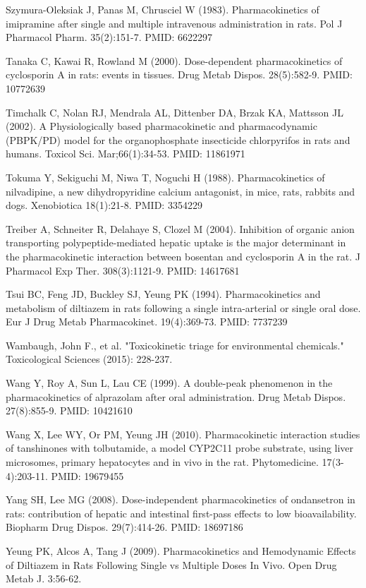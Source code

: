 \documentclass[a4paper]{book}
\begin{document}
\begin{References}
Szymura-Oleksiak J, Panas M, Chrusciel W (1983). Pharmacokinetics of
imipramine after single and multiple intravenous administration in rats. Pol
J Pharmacol Pharm. 35(2):151-7. PMID: 6622297

Tanaka C, Kawai R, Rowland M (2000). Dose-dependent pharmacokinetics of
cyclosporin A in rats: events in tissues. Drug Metab Dispos. 28(5):582-9.
PMID: 10772639

Timchalk C, Nolan RJ, Mendrala AL, Dittenber DA, Brzak KA, Mattsson JL
(2002). A Physiologically based pharmacokinetic and pharmacodynamic
(PBPK/PD) model for the organophosphate insecticide chlorpyrifos in rats and
humans. Toxicol Sci. Mar;66(1):34-53. PMID: 11861971

Tokuma Y, Sekiguchi M, Niwa T, Noguchi H (1988). Pharmacokinetics of
nilvadipine, a new dihydropyridine calcium antagonist, in mice, rats,
rabbits and dogs. Xenobiotica 18(1):21-8. PMID: 3354229

Treiber A, Schneiter R, Delahaye S, Clozel M (2004). Inhibition of organic
anion transporting polypeptide-mediated hepatic uptake is the major
determinant in the pharmacokinetic interaction between bosentan and
cyclosporin A in the rat. J Pharmacol Exp Ther. 308(3):1121-9. PMID:
14617681

Tsui BC, Feng JD, Buckley SJ, Yeung PK (1994). Pharmacokinetics and
metabolism of diltiazem in rats following a single intra-arterial or single
oral dose. Eur J Drug Metab Pharmacokinet. 19(4):369-73. PMID: 7737239

Wambaugh, John F., et al. "Toxicokinetic triage for environmental
chemicals." Toxicological Sciences (2015): 228-237.

Wang Y, Roy A, Sun L, Lau CE (1999). A double-peak phenomenon in the
pharmacokinetics of alprazolam after oral administration. Drug Metab Dispos.
27(8):855-9. PMID: 10421610

Wang X, Lee WY, Or PM, Yeung JH (2010). Pharmacokinetic interaction studies
of tanshinones with tolbutamide, a model CYP2C11 probe substrate, using
liver microsomes, primary hepatocytes and in vivo in the rat. Phytomedicine.
17(3-4):203-11. PMID: 19679455

Yang SH, Lee MG (2008). Dose-independent pharmacokinetics of ondansetron in
rats: contribution of hepatic and intestinal first-pass effects to low
bioavailability. Biopharm Drug Dispos. 29(7):414-26. PMID: 18697186

Yeung PK, Alcos A, Tang J (2009). Pharmacokinetics and Hemodynamic Effects
of Diltiazem in Rats Following Single vs Multiple Doses In Vivo. Open Drug
Metab J. 3:56-62.
\end{References}
\end{document}
